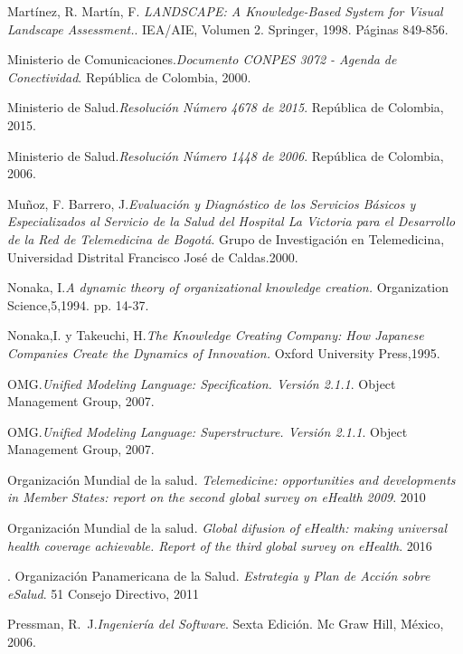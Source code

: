 \begin{thebibliography}{}
 Martínez, R. Martín, F. \textit{LANDSCAPE: A Knowledge-Based System for Visual Landscape Assessment.}. IEA/AIE, Volumen 2. Springer, 1998. Páginas 849-856.

 Ministerio de Comunicaciones.\textit{Documento CONPES 3072 - Agenda de Conectividad}. República de Colombia, 2000.

 Ministerio de Salud.\textit{Resolución Número 4678 de 2015}. República de Colombia, 2015.

 Ministerio de Salud.\textit{Resolución Número 1448 de 2006}. República de Colombia, 2006.

 Muñoz, F. Barrero, J.\textit{Evaluación y Diagnóstico de los Servicios Básicos y Especializados al Servicio de la Salud del Hospital La Victoria para el Desarrollo de la Red de Telemedicina de Bogotá}. Grupo de Investigación en Telemedicina,  Universidad Distrital Francisco José de Caldas.2000.

 Nonaka, I.\textit{A dynamic theory of organizational knowledge creation.} Organization Science,5,1994. pp. 14-37.

 Nonaka,I. y Takeuchi, H.\textit{The Knowledge Creating Company: How Japanese Companies Create the Dynamics of Innovation.} Oxford University Press,1995.

 OMG.\textit{Unified Modeling Language: Specification. Versión 2.1.1}. Object Management Group, 2007.

 OMG.\textit{Unified Modeling Language: Superstructure. Versión 2.1.1}. Object Management Group, 2007.

 Organización Mundial de la salud. \textit{Telemedicine: opportunities and developments in Member States: report on the second global survey on eHealth 2009}. 2010

 Organización Mundial de la salud. \textit{Global difusion of eHealth: making universal health coverage achievable. Report of the third global survey on eHealth}. 2016

. Organización Panamericana de la Salud. \textit{Estrategia y Plan de Acción sobre eSalud}. 51 Consejo Directivo, 2011

 Pressman, R.~J.\textit{Ingeniería del Software}. Sexta Edición. Mc Graw 
Hill, México, 2006.


\end{thebibliography}

